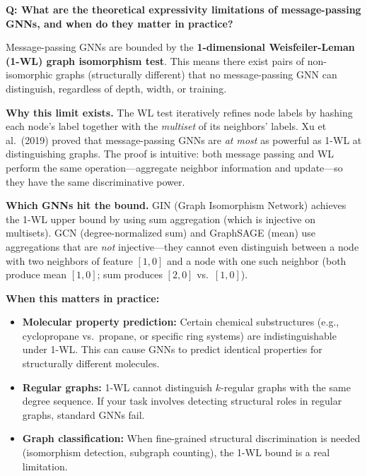 \begin{interviewq}
\textbf{Q: What are the theoretical expressivity limitations of message-passing GNNs, and when do they matter in practice?}

 \quad {} \quad \badgefreq{\freqlow}

\stronganswer

Message-passing GNNs are bounded by the \textbf{1-dimensional Weisfeiler-Leman (1-WL) graph isomorphism test}. This means there exist pairs of non-isomorphic graphs (structurally different) that no message-passing GNN can distinguish, regardless of depth, width, or training.

\textbf{Why this limit exists.} The WL test iteratively refines node labels by hashing each node's label together with the \textit{multiset} of its neighbors' labels. Xu et al.\ (2019) proved that message-passing GNNs are \textit{at most} as powerful as 1-WL at distinguishing graphs. The proof is intuitive: both message passing and WL perform the same operation---aggregate neighbor information and update---so they have the same discriminative power.

\textbf{Which GNNs hit the bound.} GIN (Graph Isomorphism Network) achieves the 1-WL upper bound by using sum aggregation (which is injective on multisets). GCN (degree-normalized sum) and GraphSAGE (mean) use aggregations that are \textit{not} injective---they cannot even distinguish between a node with two neighbors of feature $[1, 0]$ and a node with one such neighbor (both produce mean $[1, 0]$; sum produces $[2, 0]$ vs.\ $[1, 0]$).

\textbf{When this matters in practice:}
\begin{itemize}
    \item \textbf{Molecular property prediction:} Certain chemical substructures (e.g., cyclopropane vs.\ propane, or specific ring systems) are indistinguishable under 1-WL. This can cause GNNs to predict identical properties for structurally different molecules.
    \item \textbf{Regular graphs:} 1-WL cannot distinguish $k$-regular graphs with the same degree sequence. If your task involves detecting structural roles in regular graphs, standard GNNs fail.
    \item \textbf{Graph classification:} When fine-grained structural discrimination is needed (isomorphism detection, subgraph counting), the 1-WL bound is a real limitation.
\end{itemize}


\end{interviewq}
